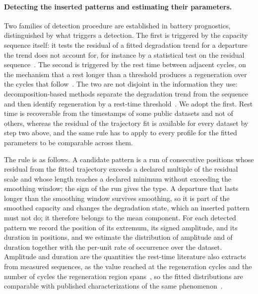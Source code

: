 \documentclass{article}
\newif\ifreview \reviewtrue        %
\newcommand{\rev}[1]{\ifreview\textcolor[HTML]{0B5FA5}{#1}\else#1\fi}
\newcommand{\revwhy}[1]{\ifreview\marginpar{\footnotesize\raggedright\textcolor[HTML]{0B5FA5}{#1}}\fi}
\newcommand{\revw}[1]{\ifreview\textcolor[HTML]{6FA8A0}{#1}\else#1\fi}   %
\begin{document}
\paragraph{Detecting the inserted patterns and estimating their parameters.}
Two families of detection procedure are established in battery prognostics\rev{, distinguished by what triggers a detection}. The first \rev{is triggered by the capacity sequence itself: it} tests the residual of a fitted degradation trend for a departure the trend does not account for\rev{, for instance} by a statistical test on the residual sequence~\cite{ma2021}\revw{.} The second \rev{is triggered by} the rest time between adjacent cycles, on the mechanism that a rest longer than a threshold produces a regeneration over the cycles that follow~\cite{qin2016,olivares2013}. \rev{The two are not disjoint in the information they use: decomposition-based methods separate the degradation trend from the sequence and then identify regeneration by a rest-time threshold~\cite{pan2022}.} We adopt the first.\revwhy{D10: pan2022 verified in full text} Rest time is recoverable from the timestamps of some public datasets and not of others, whereas the residual of the trajectory fit is available for every dataset by step two above, and the same rule has to apply to every profile for the fitted parameters to be comparable across them.

The rule is as follows. A candidate pattern is a run of consecutive positions whose residual from the fitted trajectory exceeds a declared multiple of the residual scale and whose length reaches a declared minimum \rev{without exceeding the smoothing window}; the sign of the run gives the type. \rev{A departure that lasts longer than the smoothing window survives smoothing, so it is part of the smoothed capacity and changes the degradation state, which an inserted pattern must not do; it therefore belongs to the mean component.}\revwhy{D16: patterns cannot move $z_t$} For each detected pattern we record the position of its extremum, its signed amplitude, and its duration in positions, and we estimate the distribution of amplitude and of duration together with the per-unit rate of occurrence over the dataset. Amplitude and duration are the quantities the rest-time literature also extracts from measured sequences, as the value reached at the regeneration cycles and the number of cycles the regeneration region spans~\cite{qin2016}, so the fitted distributions are comparable with published characterizations of the same phenomenon~\cite{qin2016,olivares2013}.
\end{document}
